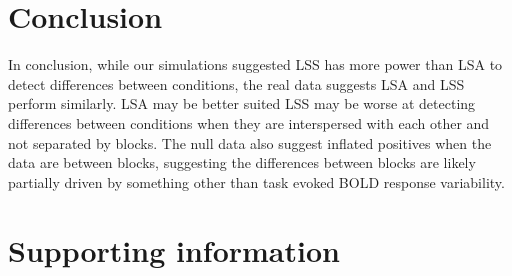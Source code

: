 \documentclass[10pt,letterpaper]{article}
\begin{document}
\section*{Conclusion}

In conclusion, while our simulations suggested LSS has more power than LSA to
detect differences between conditions, the real data suggests LSA and LSS perform similarly.
LSA may be better suited 
LSS may be worse at detecting differences between conditions when they are interspersed
with each other and not separated by blocks.
The null data also suggest inflated positives when the data are between blocks,
suggesting the differences between blocks are likely partially driven by something other than
task evoked BOLD response variability.




\section*{Supporting information}

\end{document}
